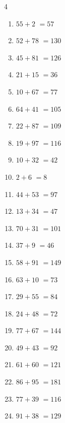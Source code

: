 \begin{multicols}{4}
\begin{enumerate}
  \item $55+2$
        $=57$

  \item $52+78$
        $=130$

  \item $45+81$
        $=126$

  \item $21+15$
        $=36$

  \item $10+67$
        $=77$

  \item $64+41$
        $=105$

  \item $22+87$
        $=109$

  \item $19+97$
        $=116$

  \item $10+32$
        $=42$

  \item $2+6$
        $=8$

  \item $44+53$
        $=97$

  \item $13+34$
        $=47$

  \item $70+31$
        $=101$

  \item $37+9$
        $=46$

  \item $58+91$
        $=149$

  \item $63+10$
        $=73$

  \item $29+55$
        $=84$

  \item $24+48$
        $=72$

  \item $77+67$
        $=144$

  \item $49+43$
        $=92$

  \item $61+60$
        $=121$

  \item $86+95$
        $=181$

  \item $77+39$
        $=116$

  \item $91+38$
        $=129$


\end{enumerate}
\end{multicols}
